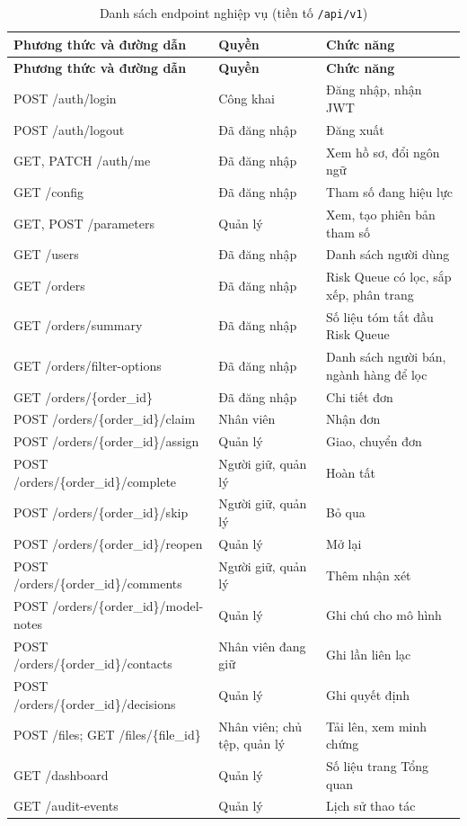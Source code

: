 {\small
\renewcommand{\arraystretch}{1.2}
\begin{longtable}{|>{\raggedright\arraybackslash}p{6.2cm}|>{\raggedright\arraybackslash}p{2.6cm}|>{\raggedright\arraybackslash}p{5.6cm}|}
\caption{Danh sách endpoint nghiệp vụ (tiền tố \texttt{/api/v1})}\label{tab:endpoint}\\ \hline
\textbf{Phương thức và đường dẫn} & \textbf{Quyền} & \textbf{Chức năng} \\ \hline \endfirsthead
\hline \textbf{Phương thức và đường dẫn} & \textbf{Quyền} & \textbf{Chức năng} \\ \hline \endhead
POST /auth/login & Công khai & Đăng nhập, nhận JWT \\ \hline
POST /auth/logout & Đã đăng nhập & Đăng xuất \\ \hline
GET, PATCH /auth/me & Đã đăng nhập & Xem hồ sơ, đổi ngôn ngữ \\ \hline
GET /config & Đã đăng nhập & Tham số đang hiệu lực \\ \hline
GET, POST /parameters & Quản lý & Xem, tạo phiên bản tham số \\ \hline
GET /users & Đã đăng nhập & Danh sách người dùng \\ \hline
GET /orders & Đã đăng nhập & Risk Queue có lọc, sắp xếp, phân trang \\ \hline
GET /orders/summary & Đã đăng nhập & Số liệu tóm tắt đầu Risk Queue \\ \hline
GET /orders/filter-options & Đã đăng nhập & Danh sách người bán, ngành hàng để lọc \\ \hline
GET /orders/\{order\_id\} & Đã đăng nhập & Chi tiết đơn \\ \hline
POST /orders/\{order\_id\}/claim & Nhân viên & Nhận đơn \\ \hline
POST /orders/\{order\_id\}/assign & Quản lý & Giao, chuyển đơn \\ \hline
POST /orders/\{order\_id\}/complete & Người giữ, quản lý & Hoàn tất \\ \hline
POST /orders/\{order\_id\}/skip & Người giữ, quản lý & Bỏ qua \\ \hline
POST /orders/\{order\_id\}/reopen & Quản lý & Mở lại \\ \hline
POST /orders/\{order\_id\}/comments & Người giữ, quản lý & Thêm nhận xét \\ \hline
POST /orders/\{order\_id\}/model-notes & Quản lý & Ghi chú cho mô hình \\ \hline
POST /orders/\{order\_id\}/contacts & Nhân viên đang giữ & Ghi lần liên lạc \\ \hline
POST /orders/\{order\_id\}/decisions & Quản lý & Ghi quyết định \\ \hline
POST /files; GET /files/\{file\_id\} & Nhân viên; chủ tệp, quản lý & Tải lên, xem minh chứng \\ \hline
GET /dashboard & Quản lý & Số liệu trang Tổng quan \\ \hline
GET /audit-events & Quản lý & Lịch sử thao tác \\ \hline
\end{longtable}
}
